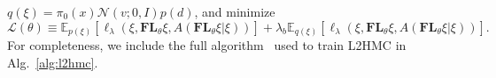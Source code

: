 \documentclass[../main.tex]{subfiles}
\begin{document}
$q(\xi) = \pi_0(x) \mathcal{N}(v; 0, I) p(d)$, and minimize
%
\begin{equation}
    \mathcal{L}(\theta)\equiv \mathbb{E}_{p(\xi)}\left[\ell_{\lambda}(\xi,
    \mathbf{FL}_{\theta}\xi, A(\mathbf{FL}_{\theta}\xi|\xi))\right] + \lambda_b
    \mathbb{E}_{q(\xi)}\left[\ell_{\lambda}(\xi, \mathbf{FL}_{\theta}\xi,
    A(\mathbf{FL}_{\theta} \xi| \xi))\right].
    \label{eq:loss_L}
\end{equation}
%
For completeness, we include the full algorithm~\cite{2017arXiv171109268L} used to train L2HMC in Alg.~\ref{alg:l2hmc}.
\end{document}
